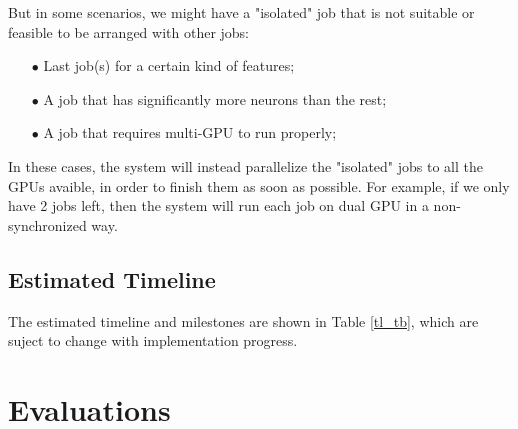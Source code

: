 \documentclass[conference]{IEEEtran}
\begin{document}
But in some scenarios, we might have a "isolated" job that is not suitable or feasible to be arranged with other jobs:
\begin{itemize}
	\item[$\bullet$]  Last job(s) for a certain kind of features;
	\item[$\bullet$]  A job that has significantly more neurons than the rest;
	\item[$\bullet$]  A job that requires multi-GPU to run properly; 
\end{itemize}
In these cases, the system will instead parallelize the "isolated" jobs to all the GPUs avaible, in order to finish them as soon as possible. 
For example, if we only have 2 jobs left, then the system will run each job on dual GPU in a non-synchronized way. 

\subsection{Estimated Timeline} \label{sebsec_esttl}

The estimated timeline and milestones are shown in Table \ref{tl_tb}, which are suject to change with implementation progress. 

\begin{table}[!htb]
	\centering
	\caption{\small 
		Estimated timeline. }
	\label{tl_tb}
\end{table}

\section{Evaluations} \label{sec_eval}
\end{document}
